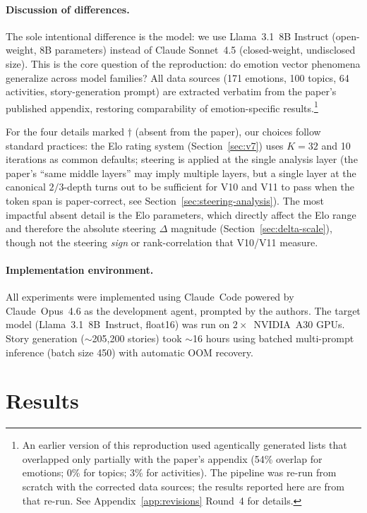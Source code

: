 \documentclass[11pt,a4paper]{article}
\begin{document}
\paragraph{Discussion of differences.}
The sole intentional difference is the model: we use Llama~3.1~8B
Instruct (open-weight, 8B parameters) instead of Claude Sonnet~4.5
(closed-weight, undisclosed size).  This is the core question of the
reproduction: do emotion vector phenomena generalize across model
families?  All data sources (171 emotions, 100 topics, 64 activities,
story-generation prompt) are extracted verbatim from the paper's
published appendix, restoring comparability of emotion-specific
results.\footnote{An earlier version of this reproduction used
agentically generated lists that overlapped only partially with the
paper's appendix (54\% overlap for emotions; 0\% for topics; 3\% for
activities).  The pipeline was re-run from scratch with the corrected
data sources; the results reported here are from that re-run.  See
Appendix~\ref{app:revisions} Round~4 for details.}

For the four details marked $\dagger$ (absent from the paper), our
choices follow standard practices: the Elo rating system
(Section~\ref{sec:v7}) uses $K{=}32$ and 10 iterations as common
defaults; steering is applied at the single analysis layer (the
paper's ``same middle layers'' may imply multiple layers, but a single
layer at the canonical $2/3$-depth turns out to be sufficient for V10
and V11 to pass when the token span is paper-correct, see
Section~\ref{sec:steering-analysis}).  The most impactful absent
detail is the Elo parameters, which directly affect the Elo range and
therefore the absolute steering $\Delta$ magnitude
(Section~\ref{sec:delta-scale}), though not the steering \emph{sign}
or rank-correlation that V10/V11 measure.

\paragraph{Implementation environment.}
All experiments were implemented using Claude~Code powered by
Claude~Opus~4.6 \citep{anthropic2025claude} as the development agent,
prompted by the authors.  The target model
(Llama~3.1~8B~Instruct, float16) was run on $2\times$~NVIDIA~A30 GPUs.
Story generation ($\sim$205{,}200 stories) took $\sim$16 hours using
batched multi-prompt inference (batch size 450) with automatic OOM
recovery.

\section{Results}
\end{document}
